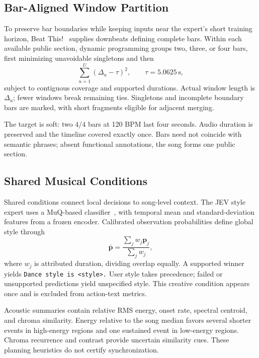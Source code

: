 \subsection{Bar-Aligned Window Partition}
To preserve bar boundaries while keeping inputs near the expert's short training horizon, Beat This!~\cite{beatthis} supplies downbeats defining complete bars. Within each available public section, dynamic programming groups two, three, or four bars, first minimizing unavoidable singletons and then
\begin{equation}
 \sum_{u=1}^{U}(\Delta_u-\tau)^2,
 \qquad \tau=5.0625\,\mathrm{s},
\end{equation}
subject to contiguous coverage and supported durations. Actual window length is $\Delta_u$; fewer windows break remaining ties. Singletons and incomplete boundary bars are marked, with short fragments eligible for adjacent merging.

The target is soft: two $4/4$ bars at 120 BPM last four seconds. Audio duration is preserved and the timeline covered exactly once. Bars need not coincide with semantic phrases; absent functional annotations, the song forms one public section.

\subsection{Shared Musical Conditions}
Shared conditions connect local decisions to song-level context.
The JEV style expert uses a MuQ-based classifier~\cite{muq}, with
temporal mean and standard-deviation features from a frozen encoder.
Calibrated observation probabilities define global style through
\begin{equation}
 \bar{\mathbf p}=\frac{\sum_j w_j\mathbf p_j}{\sum_j w_j},
\end{equation}
where $w_j$ is attributed duration, dividing overlap equally. A supported winner yields \texttt{Dance style is <style>.} User style takes precedence; failed or unsupported predictions yield unspecified style. This creative condition appears once and is excluded from action-text metrics.

Acoustic summaries contain relative RMS energy, onset rate, spectral centroid, and chroma similarity. Energy relative to the song median favors several shorter events in high-energy regions and one sustained event in low-energy regions. Chroma recurrence and contrast provide uncertain similarity cues. These planning heuristics do not certify synchronization.

